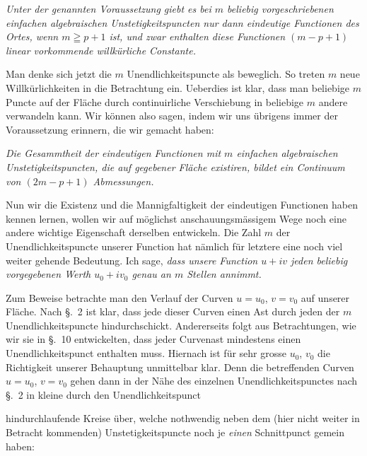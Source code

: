 \documentclass{article}
\begin{document}

\emph{Unter der genannten Voraussetzung giebt es bei $m$ beliebig vorgeschriebenen einfachen algebraischen Unstetigkeitspuncten nur dann eindeutige Functionen des Ortes, wenn $m \geqq p + 1$ ist, und zwar enthalten diese Functionen $(m - p + 1)$ linear vorkommende willkürliche Constante.}

Man denke sich jetzt die $m$ Unendlichkeitspuncte als beweglich. So treten $m$ neue Willkürlichkeiten in die Betrachtung ein. Ueberdies ist klar, dass man beliebige $m$ Puncte auf der Fläche durch continuirliche Verschiebung in beliebige $m$ andere verwandeln kann. Wir können also sagen, indem wir uns übrigens immer der Voraussetzung erinnern, die wir gemacht haben:

\emph{Die Gesammtheit der eindeutigen Functionen mit $m$ einfachen algebraischen Unstetigkeitspuncten, die auf gegebener Fläche existiren, bildet ein Continuum von $(2m - p + 1)$ Abmessungen.}

Nun wir die Existenz und die Mannigfaltigkeit der eindeutigen Functionen haben kennen lernen, wollen wir auf möglichst anschauungsmässigem Wege noch eine andere wichtige Eigenschaft derselben entwickeln. Die Zahl $m$ der Unendlichkeitspuncte unserer Function hat nämlich für letztere eine noch viel weiter gehende Bedeutung. Ich sage, \emph{dass unsere Function $u + iv$ jeden beliebig vorgegebenen Werth $u_{0} + iv_{0}$ genau an $m$ Stellen annimmt.}

Zum Beweise betrachte man den Verlauf der Curven $u = u_{0}$, $v = v_{0}$ auf unserer Fläche. Nach §.~2 ist klar, dass jede dieser Curven einen Ast durch jeden der $m$ Unendlichkeitspuncte hindurchschickt. Andererseits folgt aus Betrachtungen, wie wir sie in §.~10 entwickelten, dass jeder Curvenast mindestens einen Unendlichkeitspunct enthalten muss. Hiernach ist für sehr grosse $u_{0}$, $v_{0}$ die Richtigkeit unserer Behauptung unmittelbar klar. Denn die betreffenden Curven $u = u_{0}$, $v = v_{0}$ gehen dann in der Nähe des einzelnen Unendlichkeitspunctes nach §.~2 in kleine durch den Unendlichkeitspunct

hindurchlaufende Kreise über, welche nothwendig neben dem (hier nicht weiter in Betracht kommenden) Unstetigkeitspuncte noch je \emph{einen} Schnittpunct gemein haben:

\end{document}
